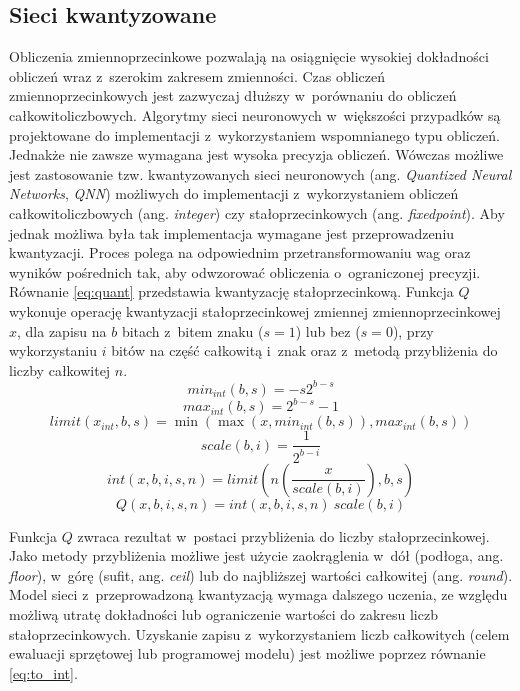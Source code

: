 \subsection{Sieci kwantyzowane}
Obliczenia zmiennoprzecinkowe pozwalają na osiągnięcie wysokiej dokładności obliczeń wraz z~szerokim zakresem zmienności.
Czas obliczeń zmiennoprzecinkowych jest zazwyczaj dłuższy w~porównaniu do obliczeń całkowitoliczbowych.
Algorytmy sieci neuronowych w~większości przypadków są projektowane do implementacji z~wykorzystaniem wspomnianego typu obliczeń. 
Jednakże nie zawsze wymagana jest wysoka precyzja obliczeń.
Wówczas możliwe jest zastosowanie tzw. kwantyzowanych sieci neuronowych (ang. \emph{Quantized Neural Networks}, \emph{QNN}) \cite{qnn} możliwych do implementacji z~wykorzystaniem obliczeń całkowitoliczbowych (ang. \emph{integer}) czy stałoprzecinkowych (ang. \emph{fixedpoint}).
Aby jednak możliwa była tak implementacja wymagane jest przeprowadzeniu kwantyzacji.
Proces polega na odpowiednim przetransformowaniu wag oraz wyników pośrednich tak, aby odwzorować obliczenia o~ograniczonej precyzji.
Równanie \eqref{eq:quant} przedstawia kwantyzację stałoprzecinkową.
Funkcja $Q$ wykonuje operację kwantyzacji stałoprzecinkowej zmiennej zmiennoprzecinkowej $x$, dla zapisu na $b$ bitach z~bitem znaku ($s=1$) lub bez ($s=0$), przy wykorzystaniu $i$ bitów na część całkowitą i~znak oraz z~metodą przybliżenia do liczby całkowitej $n$.
\begin{equation}
min_{int}(b,s) = -s 2^{b-s}
\end{equation}
\begin{equation}
max_{int}(b,s) = 2^{b-s}-1
\end{equation}
\begin{equation}
limit(x_{int},b,s) = \min(\max(x,min_{int}(b,s)),max_{int}(b,s))
\end{equation}
\begin{equation}
scale(b,i) = \frac{1}{2^{b-i}}
\end{equation}
\begin{equation}
int(x,b,i,s,n) = limit(n(\frac{x}{scale(b,i)}), b,s)
\label{eq:to_int}
\end{equation}
\begin{equation}
Q(x,b,i,s,n) = int(x,b,i,s,n) \ scale(b,i)
\label{eq:quant}
\end{equation}

Funkcja $Q$ zwraca rezultat w~postaci przybliżenia do liczby stałoprzecinkowej.
Jako metody przybliżenia możliwe jest użycie zaokrąglenia w~dół (podłoga, ang. \emph{floor}), w~górę (sufit, ang. \emph{ceil}) lub do najbliższej wartości całkowitej (ang. \emph{round}).
Model sieci z~przeprowadzoną kwantyzacją wymaga dalszego uczenia, ze względu możliwą utratę dokładności lub ograniczenie wartości do zakresu liczb stałoprzecinkowych.
Uzyskanie zapisu z~wykorzystaniem liczb całkowitych (celem ewaluacji sprzętowej lub programowej modelu) jest możliwe poprzez równanie \eqref{eq:to_int}.

